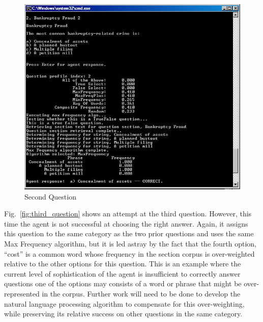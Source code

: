 \begin{figure}
\centering
\includegraphics[scale=0.75]{screen_shot_5.jpg}
\caption{Second Question}
\label{fig:second_question}
\end{figure}

Fig.~\ref{fig:third_question} shows an attempt at the third question.  However, this time the agent is not successful at choosing the right answer.  Again, it assigns this question to the same category as the two prior questions and uses the same Max Frequency algorithm, but it is led astray by the fact that the fourth option, ``cost'' is a common word whose frequency in the section corpus is over-weighted relative to the other options for this question.  This is an example where the current level of sophistication of the agent is insufficient to correctly answer questions one of the options may consists of a word or phrase that might be over-represented in the corpus.  Further work will need to be done to develop the natural language processing algorithm to compensate for this over-weighting, while preserving its relative success on other questions in the same category.

